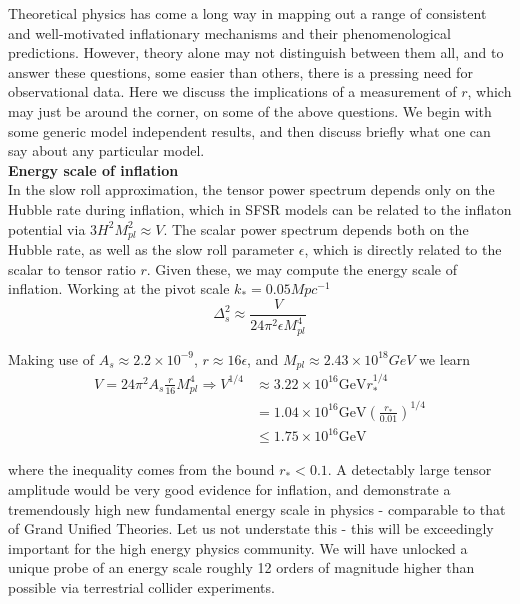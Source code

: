 \documentclass[a4paper,10pt]{article}
\newcommand{\Mp}{M_{pl}}
\begin{document}
Theoretical physics has come a long way in mapping out a range of consistent and well-motivated inflationary mechanisms and their phenomenological predictions. However, theory alone may not distinguish between them all, and to answer these questions, some easier than others, there is a pressing need for observational data. Here we discuss the implications of a measurement of $r$, which may just be around the corner, on some of the above questions. We begin with some generic model independent results, and then discuss briefly what one can say about any particular model.\\

\textbf{Energy scale of inflation} \\

In the slow roll approximation, the tensor power spectrum depends only on the Hubble rate during inflation, which in SFSR models can be related to the inflaton potential via $3H^2\Mp^2\approx V$. The scalar power spectrum depends both on the Hubble rate, as well as the slow roll parameter $\epsilon$, which is directly related to the scalar to tensor ratio $r$. Given these, we may compute the energy scale of inflation. Working at the pivot scale $k_* = 0.05Mpc^{-1}$
\begin{equation}
\Delta^2_{s}\approx \frac{V}{24\pi^2\epsilon\Mp^4}
\end{equation}

Making use of $ A_s \approx 2.2\times10^{-9}$, $r\approx 16\epsilon$, and $\Mp \approx 2.43\times 10^{18} GeV$ we learn
\begin{equation}\begin{split}
V=24\pi^2A_s\frac{r}{16}\Mp^4 \Rightarrow V^{1/4} &\approx 3.22\times10^{16}\text{GeV}r_*^{1/4}\\
&= 1.04\times10^{16}\text{GeV}(\frac{r_*}{0.01})^{1/4} \\
&\leq 1.75\times10^{16}\text{GeV}
\end{split}\end{equation}

where the inequality comes from the  bound $r_*<0.1$. A detectably large tensor amplitude would be very good evidence for inflation, and demonstrate a tremendously high new fundamental energy scale in physics - comparable to that of Grand Unified Theories. Let us not understate this - this will be exceedingly important for the high energy physics community. We will have unlocked a unique probe of an energy scale roughly 12 orders of magnitude higher than possible via terrestrial collider experiments. \\
\end{document}
